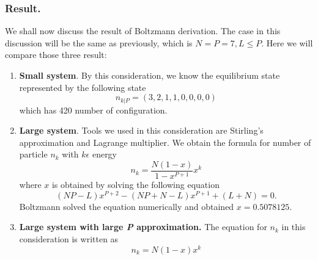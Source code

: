 \documentclass[../../../Main.tex]{subfiles}
\begin{document}
\subsubsection*{Result.} We shall now discuss the result of Boltzmann derivation. The case in this discussion will be the same as previously, which is $N = P = 7 , L \leq P$. Here we will compare those three result: 
\begin{enumerate}
    \item \textbf{Small system}. By this consideration, we know the equilibrium state represented by the following state \begin{equation*}
        n_{k|P}=(3, 2, 1, 1, 0, 0, 0, 0)
    \end{equation*} which has 420 number of configuration.
    \item \textbf{Large system}. Tools we used in this consideration are Stirling's approximation and Lagrange multiplier. We obtain the formula for number of particle $n_k$ with $k\epsilon$ energy \begin{equation*}
        n_k=\frac{N(1-x)}{1-x^{P+1}}x^k
    \end{equation*}
    where $x$ is obtained by solving the following equation
    \begin{equation*}
        (N P - L)x^{P+2} - (NP + N - L)x^{P+1} + (L + N ) = 0.
    \end{equation*}
    Boltzmann solved the equation numerically and obtained $x=0.5078125$.
    \item \textbf{Large system with large \emph{P} approximation.} The equation for $n_k$ in this consideration is written as \begin{equation*}
        n_k= N (1 - x)x^k 
    \end{equation*}
\end{enumerate}
\end{document}
